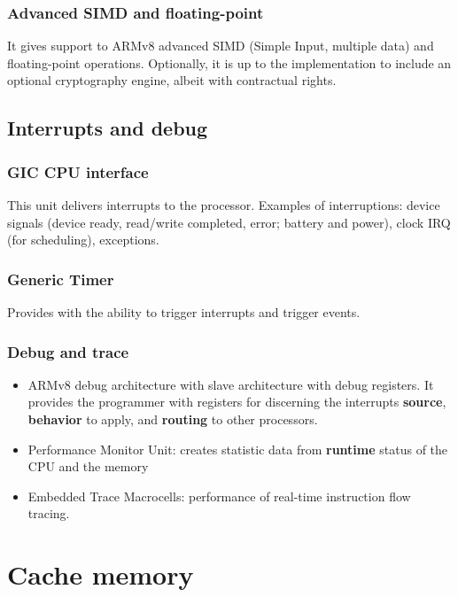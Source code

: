 \subsubsection*{Advanced SIMD and floating-point}
It gives support to ARMv8 advanced SIMD (Simple Input, multiple data) and floating-point operations. Optionally, it is up to the implementation to include an optional cryptography engine, albeit with contractual rights. \cite{cortexA72manual}

\subsection*{Interrupts and debug}

\subsubsection*{GIC CPU interface} 
\label{gic}
This unit delivers interrupts to the processor. Examples of interruptions: device signals (device ready, read/write completed, error; battery and power), clock IRQ (for scheduling), exceptions. \cite{cortexA72manual}

\subsubsection*{Generic Timer}
Provides with the ability to trigger interrupts and trigger events. \cite{cortexA72manual}

\subsubsection*{Debug and trace}
\label{debug}

\begin{itemize}
	\item {ARMv8 debug architecture with slave architecture with debug registers. It provides the programmer with registers for discerning the interrupts \textbf{source}, \textbf{behavior} to apply, and \textbf{routing} to other processors.}
	\item {Performance Monitor Unit: creates statistic data from \textbf{runtime} status of the CPU and the memory}
	\item {Embedded Trace Macrocells: performance of real-time instruction flow tracing.}
	
	\cite{cortexA72manual}
\end{itemize}
\section{Cache memory}

